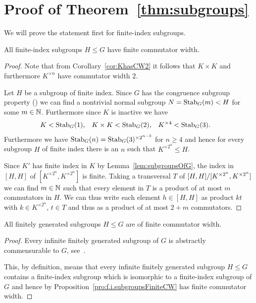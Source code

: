 \documentclass[a4paper,11pt]{amsart}
\begin{document}
\section{Proof of Theorem~\ref{thm:subgroups}}
We will prove the statement first for finite-index subgroups. 
\begin{pro}\label{pro:f.i.subgroupsFiniteCW}
  All finite-index subgroups $H \leq G$ have finite commutator width.
\end{pro}
\begin{proof}
 Note that from Corollary~\ref{cor:KhasCW2} it follows that $K\times K$ and furthermore 
 $K^{\times n}$ have commutator width $2$. 
 
 Let $H$ be a subgroup of finite index. Since $G$ has the congruence subgroup property
 (\cite{Bartholdi-Grigorchuk:parabolicSubgroups}) we can find a nontrivial normal subgroup $N=\operatorname{Stab}_G(m)<H$
 for some $m\in\mathbb{N}$. Furthermore since $K$ is inactive we have 
 \begin{align*}
  K&<\operatorname{Stab}_G(1), & K\times K&<\operatorname{Stab}_G(2), & K^{\times 4}&<\operatorname{Stab}_G(3).
 \end{align*}
 Furthermore we have $\operatorname{Stab}_G(n)=\operatorname{Stab}_G(3)^{\times 2^{n-3}}$ for $n\geq 4$ and hence for every 
 subgroup $H$ of finite index there is an $n$ such that $K^{\times 2^n}\leq H$.
  
 Since $K'$ has finite index in $K$ by Lemma~\ref{lem:subgroupsOfG}, the index in $[H,H]$ of $[K^{\times2^n},K^{\times2^n}]$ is finite.
  Taking a transversal $T$ of ${[H,H]/[K^{\times2^n},K^{\times2^n}]}$ we can find 
  $m\in \mathbb{N}$ such that every element in $T$ is a product of at most $m$ commutators in $H$.
  We can thus write each element $h\in [H,H]$ as product $kt$ with $k\in K^{\times 2^n}$, 
  $t\in T$ and thus as a product of at most $2+m$ commutators.  
\end{proof}

\begin{pro} \label{pro:fgsubgroupcw}
   All finitely generated subgroups $H \leq G$ are of finite commutator width.
\end{pro}
\begin{proof}
  Every infinite finitely generated subgroup of $G$ is abstractly
  commensurable to $G$,
  see~\cite[Theorem~1]{Grigorchuk-Wilson:Commensurability}.

  This, by definition, means that every infinite finitely generated
  subgroup $H\leq G$ contains a finite-index subgroup which is
  isomorphic to a finite-index subgroup of $G$ and hence by
  Proposition~\ref{pro:f.i.subgroupsFiniteCW} has finite commutator
  width.
\end{proof}
\end{document}
